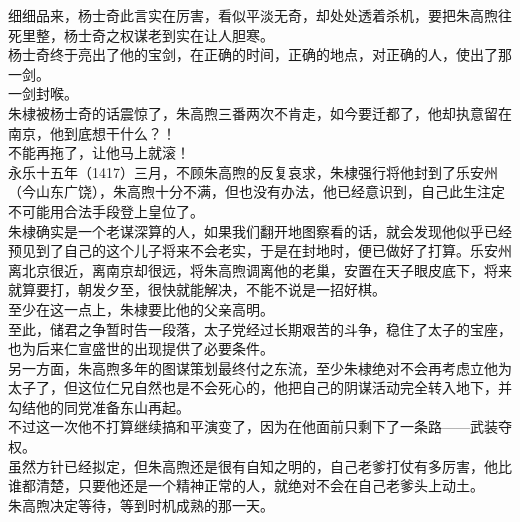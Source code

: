 \begin{multicols}{\theparacolNo}
细细品来，杨士奇此言实在厉害，看似平淡无奇，却处处透着杀机，要把朱高煦往死里整，杨士奇之权谋老到实在让人胆寒。\\

杨士奇终于亮出了他的宝剑，在正确的时间，正确的地点，对正确的人，使出了那一剑。\\

一剑封喉。\\

朱棣被杨士奇的话震惊了，朱高煦三番两次不肯走，如今要迁都了，他却执意留在南京，他到底想干什么？！\\

不能再拖了，让他马上就滚！\\

永乐十五年（1417）三月，不顾朱高煦的反复哀求，朱棣强行将他封到了乐安州（今山东广饶），朱高煦十分不满，但也没有办法，他已经意识到，自己此生注定不可能用合法手段登上皇位了。\\

朱棣确实是一个老谋深算的人，如果我们翻开地图察看的话，就会发现他似乎已经预见到了自己的这个儿子将来不会老实，于是在封地时，便已做好了打算。乐安州离北京很近，离南京却很远，将朱高煦调离他的老巢，安置在天子眼皮底下，将来就算要打，朝发夕至，很快就能解决，不能不说是一招好棋。\\

至少在这一点上，朱棣要比他的父亲高明。\\

至此，储君之争暂时告一段落，太子党经过长期艰苦的斗争，稳住了太子的宝座，也为后来仁宣盛世的出现提供了必要条件。\\

另一方面，朱高煦多年的图谋策划最终付之东流，至少朱棣绝对不会再考虑立他为太子了，但这位仁兄自然也是不会死心的，他把自己的阴谋活动完全转入地下，并勾结他的同党准备东山再起。\\

不过这一次他不打算继续搞和平演变了，因为在他面前只剩下了一条路——武装夺权。\\

虽然方针已经拟定，但朱高煦还是很有自知之明的，自己老爹打仗有多厉害，他比谁都清楚，只要他还是一个精神正常的人，就绝对不会在自己老爹头上动土。\\

朱高煦决定等待，等到时机成熟的那一天。\\
\ifnum{}
	\end{multicols}
\fi
\newpage
